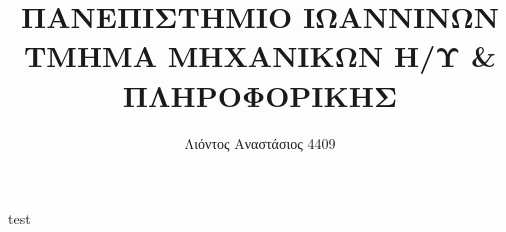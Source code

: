 \documentclass{article}[40pt]
\title{ΠΑΝΕΠΙΣΤΗΜΙΟ ΙΩΑΝΝΙΝΩΝ \\ ΤΜΗΜΑ ΜΗΧΑΝΙΚΩΝ Η/Υ  \&  ΠΛΗΡΟΦΟΡΙΚΗΣ}
\author{Λιόντος Αναστάσιος 4409}
\begin{document}
\maketitle
\newpage
test
\end{document}
